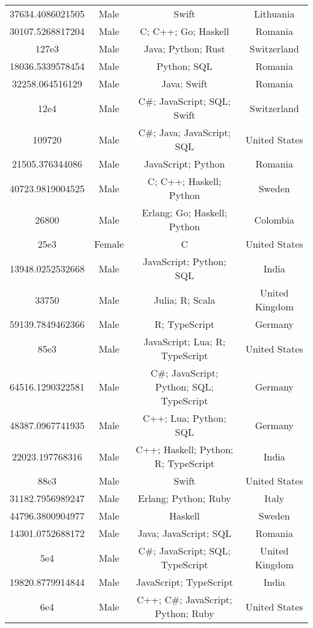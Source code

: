 \begin{center}
\begin{tabular}{ |c|c|c|c| }
37634.4086021505  &  Male  &  Swift  &  Lithuania  \\ 
30107.5268817204  &  Male  &  C; C++; Go; Haskell  &  Romania  \\ 
127e3  &  Male  &  Java; Python; Rust  &  Switzerland  \\ 
18036.5339578454  &  Male  &  Python; SQL  &  Romania  \\ 
32258.064516129  &  Male  &  Java; Swift  &  Romania  \\ 
12e4  &  Male  &  C\#; JavaScript; SQL; Swift  &  Switzerland  \\ 
109720  &  Male  &  C\#; Java; JavaScript; SQL  &  United States  \\ 
21505.376344086  &  Male  &  JavaScript; Python  &  Romania  \\ 
40723.9819004525  &  Male  &  C; C++; Haskell; Python  &  Sweden  \\ 
26800  &  Male  &  Erlang; Go; Haskell; Python  &  Colombia  \\ 
25e3  &  Female  &  C  &  United States  \\ 
13948.0252532668  &  Male  &  JavaScript; Python; SQL  &  India  \\ 
33750  &  Male  &  Julia; R; Scala  &  United Kingdom  \\ 
59139.7849462366  &  Male  &  R; TypeScript  &  Germany  \\ 
85e3  &  Male  &  JavaScript; Lua; R; TypeScript  &  United States  \\ 
64516.1290322581  &  Male  &  C\#; JavaScript; Python; SQL; TypeScript  &  Germany  \\ 
48387.0967741935  &  Male  &  C++; Lua; Python; SQL  &  Germany  \\ 
22023.197768316  &  Male  &  C++; Haskell; Python; R; TypeScript  &  India  \\ 
88e3  &  Male  &  Swift  &  United States  \\ 
31182.7956989247  &  Male  &  Erlang; Python; Ruby  &  Italy  \\ 
44796.3800904977  &  Male  &  Haskell  &  Sweden  \\ 
14301.0752688172  &  Male  &  Java; JavaScript; SQL  &  Romania  \\ 
5e4  &  Male  &  C\#; JavaScript; SQL; TypeScript  &  United Kingdom  \\ 
19820.8779914844  &  Male  &  JavaScript; TypeScript  &  India  \\ 
6e4  &  Male  &  C++; C\#; JavaScript; Python; Ruby  &  United States  \\ 

\end{tabular}
\end{center}
